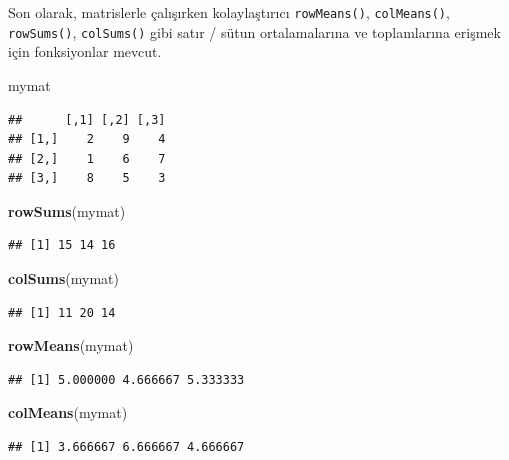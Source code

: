 \documentclass[]{book}
\newenvironment{Shaded}{\begin{snugshade}}{\end{snugshade}}
\newcommand{\KeywordTok}[1]{\textcolor[rgb]{0.13,0.29,0.53}{\textbf{#1}}}
\newcommand{\NormalTok}[1]{#1}
\begin{document}
Son olarak, matrislerle çalışırken kolaylaştırıcı \texttt{rowMeans()},
\texttt{colMeans()}, \texttt{rowSums()}, \texttt{colSums()} gibi satır /
sütun ortalamalarına ve toplamlarına erişmek için fonksiyonlar mevcut.

\begin{Shaded}
\begin{Highlighting}[]
\NormalTok{mymat}
\end{Highlighting}
\end{Shaded}

\begin{verbatim}
##      [,1] [,2] [,3]
## [1,]    2    9    4
## [2,]    1    6    7
## [3,]    8    5    3
\end{verbatim}

\begin{Shaded}
\begin{Highlighting}[]
\KeywordTok{rowSums}\NormalTok{(mymat)}
\end{Highlighting}
\end{Shaded}

\begin{verbatim}
## [1] 15 14 16
\end{verbatim}

\begin{Shaded}
\begin{Highlighting}[]
\KeywordTok{colSums}\NormalTok{(mymat)}
\end{Highlighting}
\end{Shaded}

\begin{verbatim}
## [1] 11 20 14
\end{verbatim}

\begin{Shaded}
\begin{Highlighting}[]
\KeywordTok{rowMeans}\NormalTok{(mymat)}
\end{Highlighting}
\end{Shaded}

\begin{verbatim}
## [1] 5.000000 4.666667 5.333333
\end{verbatim}

\begin{Shaded}
\begin{Highlighting}[]
\KeywordTok{colMeans}\NormalTok{(mymat)}
\end{Highlighting}
\end{Shaded}

\begin{verbatim}
## [1] 3.666667 6.666667 4.666667
\end{verbatim}


\end{document}
